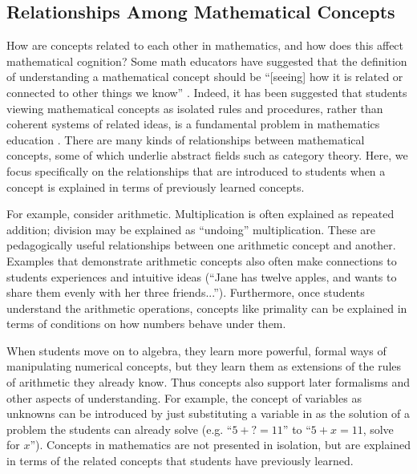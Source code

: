 \documentclass[man,10pt]{apa6}
\begin{document}
\subsection{Relationships Among Mathematical Concepts}
How are concepts related to each other in mathematics, and how does this affect mathematical cognition? Some math educators have suggested that the definition of understanding a mathematical concept should be ``[seeing] how it is related or connected to other things we know'' \cite{Hiebert1997}. Indeed, it has been suggested that students viewing mathematical concepts as isolated rules and procedures, rather than coherent systems of related ideas, is a fundamental problem in mathematics education \cite{Richland2012}. There are many kinds of relationships between mathematical concepts, some of which underlie abstract fields such as category theory. Here, we focus specifically on the relationships that are introduced to students when a concept is explained in terms of previously learned concepts. \par %
For example, consider arithmetic. Multiplication is often explained as repeated addition; division may be explained as ``undoing'' multiplication. These are pedagogically useful relationships between one arithmetic concept and another. Examples that demonstrate arithmetic concepts also often make connections to students experiences and intuitive ideas (``Jane has twelve apples, and wants to share them evenly with her three friends...''). Furthermore, once students understand the arithmetic operations, concepts like primality can be explained in terms of conditions on how numbers behave under them. \par
When students move on to algebra, they learn more powerful, formal ways of manipulating numerical concepts, but they learn them as extensions of the rules of arithmetic they already know. Thus concepts also support later formalisms and other aspects of understanding. For example, the concept of variables as unknowns can be introduced by just substituting a variable in as the solution of a problem the students can already solve (e.g. ``$5+?=11$'' to ``$5+x=11$, solve for $x$''). Concepts in mathematics are not presented in isolation, but are explained in terms of the related concepts that students have previously learned. \par 
\end{document}
